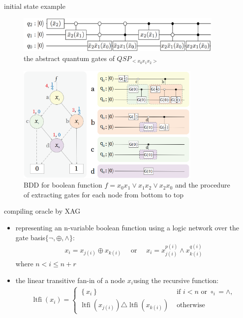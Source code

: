   \begin{frame}{initial state example}
    \begin{figure}[htbq]
      \centering
      \includegraphics[width=0.9\textwidth]{figure/qsp_example.png}
      \caption{the abstract quantum gates of $QSP_{<x_0x_1x_2>}$} 
      \label{fig-qsp-example}
    \end{figure}
  \end{frame}
  \begin{frame}
    \begin{figure}[htbq]
      \centering
      \includegraphics[width=0.8\textwidth]{figure/qsp_circuit.png}
      \caption{BDD  for boolean function $f= x_0x_1\vee x_1x_2 \vee x_2x_0 $ and  the  procedure  of  extracting  gates  for  each node from bottom to top} 
      \label{fig-qsp-example-circuit}
    \end{figure}
  \end{frame}
  \begin{frame}{compiling oracle by XAG}
    \begin{itemize}
      \item representing an n-variable boolean function using a logic network over the gate basis$\{\lnot ,\oplus ,\wedge \}$:
      \begin{align}
        x_{i} = x_{j(i)} \oplus x_{k(i)} \quad \text { or } \quad x_{i} = x_{j(i)}^{p(i)} \wedge x_{k(i)}^{q(i)}
      \end{align}
      where $n< i \leq n+r$
      \item  the linear transitive fan-in of a node $x_i $using the recursive function:
      \begin{align}
        \operatorname{ltfi}\left(x_{i}\right) = \left\{\begin{array}{ll}
        \left\{x_{i}\right\} & \text { if } i < n \text { or } \circ_{i}  = \wedge, \\
        \operatorname{ltfi}\left(x_{j(i)}\right) \triangle \operatorname{ltfi}\left(x_{k(i)}\right) & \text { otherwise }
        \end{array}\right.
      \end{align}
    \end{itemize}
  \end{frame}
